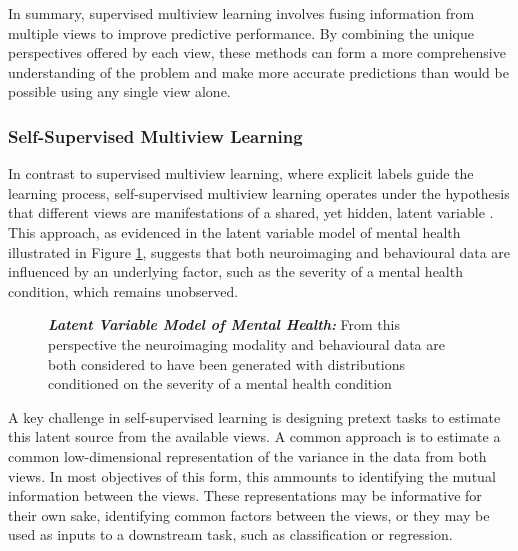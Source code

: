 In summary, supervised multiview learning involves fusing information from multiple \gls{views} to improve predictive performance. By combining the unique perspectives offered by each view, these methods can form a more comprehensive understanding of the problem and make more accurate predictions than would be possible using any single view alone.

\subsubsection{Self-Supervised Multiview Learning}

In contrast to supervised multiview learning, where explicit labels guide the learning process, self-supervised multiview learning operates under the hypothesis that different \gls{views} are manifestations of a shared, yet hidden, latent variable \citep{zong2023self}.
This approach, as evidenced in the latent variable model of mental health illustrated in Figure \ref{fig:mentalhealthselfsupervised}, suggests that both neuroimaging and behavioural data are influenced by an underlying factor, such as the severity of a mental health condition, which remains unobserved.

\begin{figure}
    \centering
    \caption[Latent Variable Model of Mental Health]{\textit{\textbf{Latent Variable Model of Mental Health:}} From this perspective the neuroimaging modality and behavioural data are both considered to have been generated with distributions conditioned on the severity of a mental health condition}\label{fig:mentalhealthselfsupervised}
\end{figure}

A key challenge in self-supervised learning is designing pretext tasks to estimate this latent source from the available views.
A common approach is to estimate a common low-dimensional representation of the variance in the data from both \gls{views}.
In most objectives of this form, this ammounts to identifying the mutual information between the \gls{views}.
These \gls{representations} may be informative for their own sake, identifying common factors between the \gls{views}, or they may be used as inputs to a downstream task, such as classification or regression.

